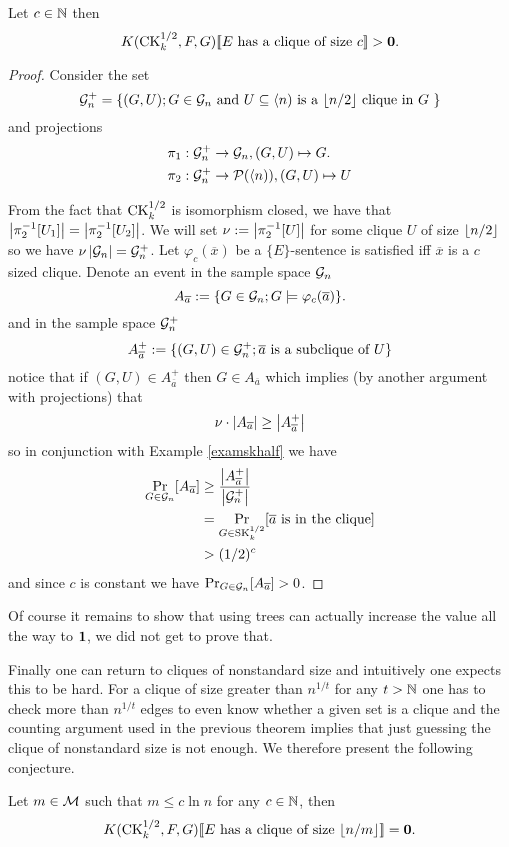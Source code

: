 \begin{thrm}\label{thrmck}
Let $c\in\mathbb{N}$ then 
\[K(\text{CK}_k^{1/2},F,G)[\![\text{$E$ has a clique of size $c$}]\!]>\textbf{0}.\]
\end{thrm}
\begin{proof}
Consider the set \[\mathcal{G}_n^+=\{(G,U);\text{$G\in \mathcal{G}_n$ and $U\subseteq \langle n)$ is a $\left \lfloor {n/2} \right \rfloor$ clique in $G$ }\}\]
and projections
\begin{align*}
\pi_1:\mathcal{G}_n^+&\to\mathcal{G}_n,(G,U)\mapsto G.\\
\pi_2:\mathcal{G}_n^+&\to\mathcal{P}(\langle n)),(G,U)\mapsto U
\end{align*}

From the fact that $\text{CK}_k^{1/2}$ is isomorphism closed, we have that $\left|{\pi_2^{-1}[U_1]}\right|=\left|{\pi_2^{-1}[U_2]}\right|$. We will set $\nu:=\left|{\pi_2^{-1}[U]}\right|$ for some clique $U$ of size $\left \lfloor {n/2} \right \rfloor$ so we have $\nu\left|{\mathcal{G}_n}\right|=\mathcal{G}_n^+$. Let $\varphi_c(\overline x)$ be a $\{E\}$-sentence is satisfied iff $\overline x$ is a $c$ sized clique.  Denote an event in the sample space $\mathcal{G}_n$
\[A_{\overline a} :=\{G\in\mathcal{G}_n;G\models \varphi_c(\overline a)\}.\]
and in the sample space $\mathcal{G}_n^+$
\[A_{\overline a}^+ :=\{(G,U)\in\mathcal{G}_n^+;\overline a\text{ is a subclique of $U$}\}\]
notice that if $(G,U)\in A_{\overline a}^+$ then $G\in A_{\overline a}$ which implies (by another argument with projections) that
\[\nu\cdot\left|{A_{\overline a}}\right|\geq \left|{A_{\overline a}^+}\right|\]
so in conjunction with Example \ref{examskhalf} we have
\begin{align*}
\Pr_{G\in\mathcal{G}_n}[A_{\overline a}]&\geq \frac{\left|{A_{\overline a}^+}\right|}{\left|{\mathcal{G}_n^+}\right|}\\
&= \Pr_{G\in\text{SK}_{k}^{1/2}}[\overline a \text{ is in the clique}]\\
&>(1/2)^c
\end{align*}
and since $c$ is constant we have $\Pr_{G\in\mathcal{G}_n}[A_{\overline a}]>0$.
\end{proof}

Of course it remains to show that using trees can actually increase the value all the way to $\textbf{1}$, we did not get to prove that.

Finally one can return to cliques of nonstandard size and intuitively one expects this to be hard. For a clique of size greater than $n^{1/t}$ for any $t>\mathbb{N}$ one has to check more than $n^{1/t}$ edges to even know whether a given set is a clique and the counting argument used in the previous theorem implies that just guessing the clique of nonstandard size is not enough. We therefore present the following conjecture.

\begin{conj}
Let $m\in\mathcal{M}$ such that $m\leq c \ln n$ for any $c\in\mathbb{N}$, then
\[K(\text{CK}_k^{1/2},F,G)[\![\text{$E$ has a clique of size $\left \lfloor {n/m} \right \rfloor$}]\!]=\textbf{0}.\]
\end{conj}
